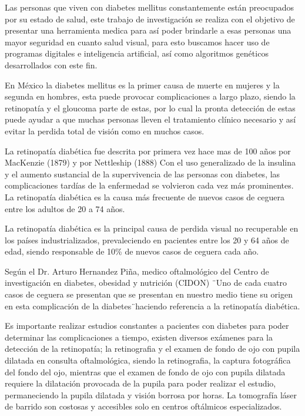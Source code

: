 \documentclass[12pt,letterpaper]{article}
\begin{document}
Las personas que viven con diabetes mellitus constantemente están preocupados por su estado de salud, este trabajo de investigación se realiza con el objetivo de presentar una herramienta medica para así poder brindarle a esas personas una mayor seguridad en cuanto salud visual, para esto buscamos hacer uso de programas digitales e inteligencia artificial, así como algoritmos genéticos desarrollados con este fin.\cite{Esparza}

En México la diabetes mellitus es la primer causa de muerte en mujeres y la segunda en hombres, esta puede provocar complicaciones a largo plazo, siendo la retinopatía y el gloucoma parte de estas, por lo cual la pronta detección de estas puede ayudar a que muchas personas lleven el tratamiento clínico necesario y así evitar la perdida total de visión como en muchos casos.

La retinopatía diabética fue descrita por primera vez 
hace mas de 100 años por MacKenzie (1879) y por Nettleship (1888) Con el uso generalizado de la insulina y el aumento sustancial de la supervivencia de las personas con diabetes, las complicaciones tardías de la enfermedad se volvieron cada vez más prominentes.
La retinopatía diabética es la causa más frecuente de nuevos casos de ceguera entre los adultos de 20 a 74 años.\cite{Dosal}

La retinopatía diabética es la principal causa de perdida visual no recuperable en los países industrializados, prevaleciendo en pacientes entre los 20 y 64 años de edad, siendo responsable de 10\% de nuevos casos de ceguera cada año.\cite{Aliseda} 
 
Según el Dr. Arturo Hernandez Piña, medico oftalmológico del Centro de investigación en diabetes, obesidad y nutrición (CIDON) \"\ Uno de cada cuatro casos de ceguera se presentan que se presentan en nuestro medio tiene su origen en esta complicación de la diabetes\"\ haciendo referencia a la retinopatía diabética.

Es importante realizar estudios constantes a pacientes con diabetes para poder determinar las complicaciones a tiempo, existen diversos exámenes para la detección de la retinopatía; la retinografia y el examen de fondo de ojo con pupila dilatada en consulta oftalmológica, siendo la retinografia, la captura fotográfica del fondo del ojo, mientras que el examen de fondo de ojo con pupila dilatada requiere la dilatación provocada de la pupila para poder realizar el estudio, permaneciendo la pupila dilatada y visión borrosa por horas. La tomografía láser de barrido son costosas y accesibles solo en centros oftálmicos especializados. \cite{Stapor2004}
\end{document}
